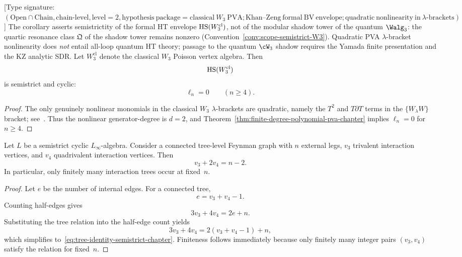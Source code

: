 \begin{corollary}
\label{cor:semistrictity-classical-W3-chapter}
\textup{[}Type signature:
$(\mathrm{Open}\cap\mathrm{Chain},\mathrm{chain\text{-}level},
\mathrm{level}=2,
\mathrm{hypothesis\ package}=\mathrm{classical\ }W_3\mathrm{\ PVA};
\mathrm{Khan\text{--}Zeng\ formal\ BV\ envelope};
\mathrm{quadratic\ nonlinearity\ in\ }\lambda\mathrm{\text{-}brackets})$\textup{]}
The corollary asserts semistrictity of the formal HT envelope $\operatorname{HS}(W_3^{\mathrm{cl}})$, not of the
modular shadow tower of the quantum $\Walg_3$: the quartic resonance
class $\mathfrak Q$ of the shadow tower remains nonzero
\textup{(}Convention~\textup{\ref{conv:scope-semistrict-W3}}\textup{)}.
Quadratic PVA $\lambda$-bracket nonlinearity does \emph{not} entail
all-loop quantum HT theory; passage to the quantum $\cW_3$ shadow
requires the Yamada finite presentation and the KZ analytic SDR.
Let $W_3^{\mathrm{cl}}$ denote the classical $W_3$ Poisson vertex algebra. Then
\[
\operatorname{HS}(W_3^{\mathrm{cl}})
\]
is semistrict and cyclic:
\[
\ell_n=0
\qquad
(n\ge 4).
\]
\end{corollary}

\begin{proof}
The only genuinely nonlinear monomials in the classical $W_3$ $\lambda$-brackets are quadratic, namely the $T^2$ and $T\partial T$ terms in the $\{W{}_{\lambda}W\}$ bracket; see~\cite[\S\,4]{KhanZeng25}. Thus the nonlinear generator-degree is $d=2$, and Theorem~\ref{thm:finite-degree-polynomial-pva-chapter} implies $\ell_n=0$ for $n\ge 4$.\qedhere
\end{proof}

\begin{proposition}
\label{prop:tree-identity-semistrict-chapter}
Let $L$ be a semistrict cyclic $L_\infty$-algebra. Consider a connected tree-level Feynman graph with $n$ external legs, $v_3$ trivalent interaction vertices, and $v_4$ quadrivalent interaction vertices. Then
\begin{equation}
\label{eq:tree-identity-semistrict-chapter}
v_3+2v_4=n-2.
\end{equation}
In particular, only finitely many interaction trees occur at fixed~$n$.
\end{proposition}

\begin{proof}
Let $e$ be the number of internal edges. For a connected tree,
\[
e=v_3+v_4-1.
\]
Counting half-edges gives
\[
3v_3+4v_4=2e+n.
\]
Substituting the tree relation into the half-edge count yields
\[
3v_3+4v_4=2(v_3+v_4-1)+n,
\]
which simplifies to~\eqref{eq:tree-identity-semistrict-chapter}. Finiteness follows immediately because only finitely many integer pairs $(v_3,v_4)$ satisfy the relation for fixed~$n$.\qedhere
\end{proof}

